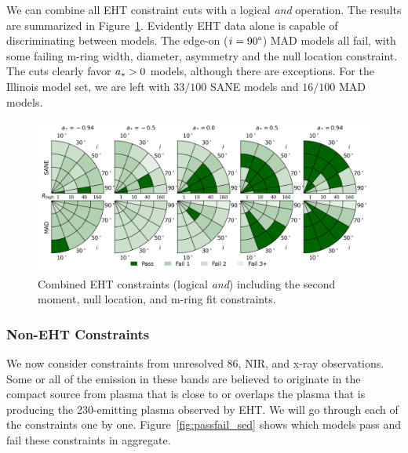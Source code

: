 We can combine all EHT constraint cuts with a logical {\em and} operation.  The results are summarized in Figure~\ref{fig:all_EHT_constraints}.  Evidently EHT data alone is capable of discriminating between models.   The edge-on ($i = 90\degree$) MAD models all fail, with some failing m-ring width, diameter, asymmetry and the null location constraint.  The cuts clearly favor $a_* > 0$ models, although there are exceptions.  For the Illinois model set, we are left with $33/100$ SANE models and $16/100$ MAD models.

\begin{figure}
  \centering
    \includegraphics[width=\textwidth]{./figures/Interferometric_Constraints.png}
  \caption{Combined EHT constraints (logical {\em and}) including the second moment, null location, and m-ring fit constraints.}
  \label{fig:all_EHT_constraints}
\end{figure}

\subsubsection{Non-EHT Constraints}

We now consider constraints from unresolved 86\GHz, NIR, and x-ray
observations.
Some or all of the emission in these bands are believed to originate
in the compact source from plasma that is close to or overlaps the
plasma that is producing the 230\GHz-emitting plasma observed by EHT.
We will go through each of the constraints one by one.
Figure~\ref{fig:passfail_sed} shows which models pass and fail these
constraints in aggregate.


